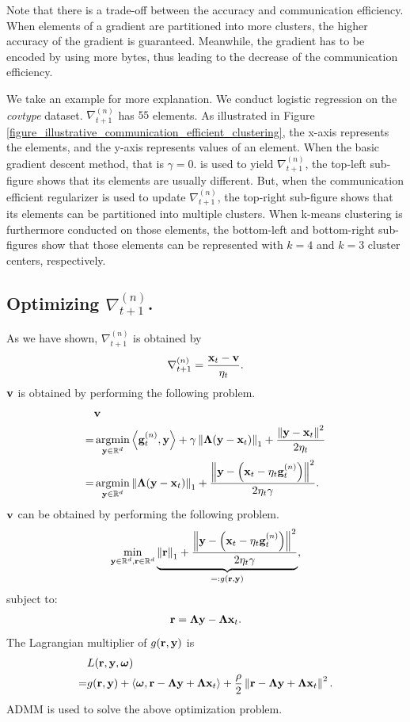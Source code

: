 \documentclass[journal]{IEEEtran}
\begin{document}
Note that there is a trade-off between the accuracy and communication efficiency. When elements of a gradient are partitioned into more clusters, the higher accuracy of the gradient is guaranteed. Meanwhile, the gradient has to be encoded by using more bytes, thus leading to the decrease of the communication efficiency.  

We take an example for more explanation. We conduct logistic regression on the \textit{covtype} dataset. $\nabla_{t+1}^{(n)}$ has $55$ elements. As illustrated in Figure \ref{figure_illustrative_communication_efficient_clustering}, the x-axis represents the elements, and the y-axis represents values of an element. When the basic gradient descent method, that is $\gamma = 0$. is used to yield $\nabla_{t+1}^{(n)}$, the top-left sub-figure shows that its elements are usually different. But, when the communication efficient regularizer is used to update $\nabla_{t+1}^{(n)}$, the top-right sub-figure shows that its elements can be partitioned into multiple clusters.  When k-means clustering is furthermore conducted on those elements, the bottom-left and bottom-right sub-figures show that those elements can be represented with $k=4$ and $k=3$ cluster centers, respectively.  



\subsection{Optimizing $\nabla_{t+1}^{(n)}$.}
As we have shown, $\nabla_{t+1}^{(n)}$ is obtained by 
\begin{align}
\nonumber
\nabla_{t+1}^{(n)} = \frac{{\bf x}_t - {\bf v}}{\eta_t}.
\end{align} ${\bf v}$ is obtained by performing the following problem.
\begin{align}
\nonumber
& \v \\ \nonumber
= & \argmin_{\y\in\RR^d} \lrangle {\g^{(n)}_t, \y} + \gamma \lrnorm{\bLambda(\y - \x_t)}_1 + \frac{\lrnorm{\y - \x_t}^2}{2\eta_t} \\ \nonumber
= & \argmin_{\y\in\RR^d} \lrnorm{\bLambda(\y - \x_t)}_1 + \frac{\lrnorm{\y - \lrincir{\x_t - \eta_t\g_t^{(n)}}}^2}{2\eta_t\gamma}.
\end{align} ${\bf v}$ can be obtained by performing the following problem.
\begin{align}
\nonumber
\min_{{\bf y}\in\mathbb{R}^d, {\bf r}\in\mathbb{R}^d} \underbrace{\left\lVert{\bf r}\right\rVert_1 + \frac{\left\lVert{\bf y} - \left( {\bf x}_t - \eta_t{\bf g}_t^{(n)} \right)\right\rVert^2}{2\eta_t\gamma}}_{=: g({\bf r}, {\bf y})},
\end{align} subject to:
\begin{align}
\nonumber
{\bf r} = \mathbf{\Lambda} {\bf y} - \mathbf{\Lambda} {\bf x}_t.
\end{align} The Lagrangian multiplier of $g({\bf r}, {\bf y})$ is 
\begin{align}
\nonumber
& L({\bf r}, {\bf y}, \boldsymbol{\omega})  \\ \nonumber
= & g({\bf r}, {\bf y}) + \left\langle\boldsymbol{\omega}, {\bf r} - \mathbf{\Lambda} {\bf y} + \mathbf{\Lambda}{\bf x}_t \right\rangle + \frac{\rho}{2}\left\lVert{\bf r} - \mathbf{\Lambda} {\bf y} + \mathbf{\Lambda}{\bf x}_t\right\rVert^2.
\end{align} ADMM\cite{xx} is used to solve the above optimization problem.
\end{document}
